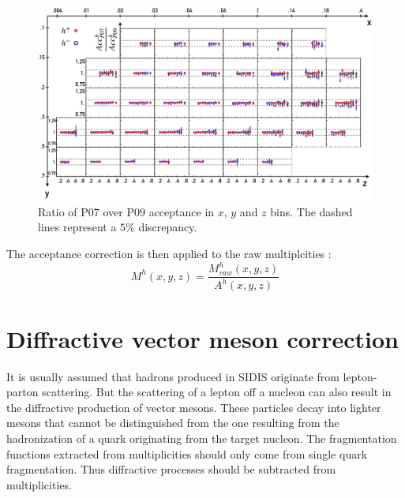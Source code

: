\begin{figure}
  \centering
	\includegraphics[scale=0.6]{./gfx/SysAcc.png}
	\caption{Ratio of P$07$ over P$09$ acceptance in $x$, $y$ and $z$ bins. The dashed lines represent a $5$\% discrepancy.}
	\label{pic:AccPer}
\end{figure}

The acceptance correction is then applied to the raw multiplcities :
%
\begin{equation}
  M^h(x,y,z) = \frac{M^h_{raw}(x,y,z)}{A^h(x,y,z)}
\end{equation}
%
\newpage

\section{Diffractive vector meson correction} \label{sec:DVMf}

It is usually assumed that hadrons produced in SIDIS originate from lepton-parton scattering. But the scattering of a lepton off a nucleon can also result in the diffractive production of vector mesons. These particles decay into lighter mesons that cannot be distinguished from the one resulting from the hadronization of a quark originating from the target nucleon. The fragmentation functions extracted from multiplicities should only come from single quark fragmentation. Thus diffractive processes should be subtracted from multiplicities.

